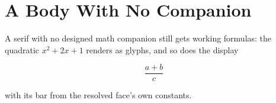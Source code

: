 \documentclass{article}
\begin{document}
\section{A Body With No Companion}

A serif with no designed math companion still gets working formulas: the
quadratic $x^2 + 2x + 1$ renders as glyphs, and so does the display

\[ \frac{a + b}{c} \]

with its bar from the resolved face's own constants.
\end{document}
